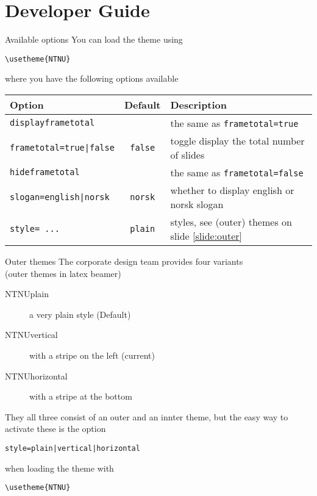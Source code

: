 \documentclass[aspectratio=169]{beamer}
\begin{document}
	\section{Developer Guide}
		\begin{frame}[fragile]{Available options}
			\label{slide:developer}
			You can load the theme using

			\lstinline!\usetheme{NTNU}!

			where you have the following options available

			\begin{tabular}{lcl}
				\toprule
				\textbf{Option} & \textbf{Default} &\textbf{Description} \\
				\midrule
				\lstinline!displayframetotal! && the same as \lstinline!frametotal=true! \\
				\lstinline!frametotal=true|false! & \lstinline!false! & toggle display the total number of slides\\
				\lstinline!hideframetotal! && the same as \lstinline!frametotal=false! \\
				\lstinline!slogan=english|norsk! & \lstinline!norsk! & whether to display english or norsk slogan\\
				\lstinline!style= ...! & \lstinline!plain! & styles, see (outer) themes on slide \ref{slide:outer}\\
				\bottomrule
			\end{tabular}
		\end{frame}
		\begin{frame}[fragile]{Outer themes}
			\label{slide:outer}
			The corporate design team provides four variants
			\\\hfill{\small (outer themes in latex beamer)}

			\begin{description}
				\item[NTNUplain] a very plain style (Default)
				\item[NTNUvertical] with a stripe on the left (current)
				\item[NTNUhorizontal] with a stripe at the bottom
			\end{description}

			They all three consist of an outer and an innter theme, but the easy way to activate these is the option

			\lstinline!style=plain|vertical|horizontal!

			when loading the theme with

			\lstinline!\usetheme{NTNU}!
		\end{frame}
\end{document}
